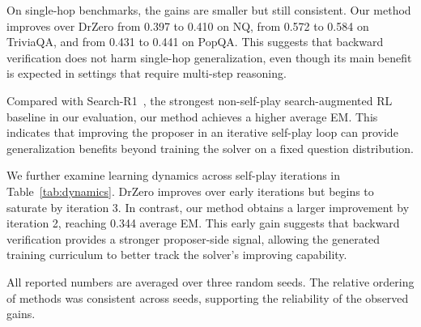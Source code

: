 \documentclass{article}
\begin{document}
On single-hop benchmarks, the gains are smaller but still consistent. Our
method improves over DrZero from 0.397 to 0.410 on NQ, from 0.572 to 0.584 on
TriviaQA, and from 0.431 to 0.441 on PopQA. This suggests that backward
verification does not harm single-hop generalization, even though its main
benefit is expected in settings that require multi-step reasoning.

Compared with Search-R1~\cite{SearchR1}, the strongest non-self-play
search-augmented RL baseline in our evaluation, our method achieves a higher
average EM. This indicates that improving the proposer in an iterative
self-play loop can provide generalization benefits beyond training the solver
on a fixed question distribution.

We further examine learning dynamics across self-play iterations in
Table~\ref{tab:dynamics}. DrZero improves over early iterations but begins to
saturate by iteration 3. In contrast, our method obtains a larger improvement by
iteration 2, reaching 0.344 average EM. This early gain suggests that backward
verification provides a stronger proposer-side signal, allowing the generated
training curriculum to better track the solver's improving capability.

All reported numbers are averaged over three random seeds. The relative ordering of methods was consistent across seeds, supporting the reliability of the observed gains.
\end{document}

